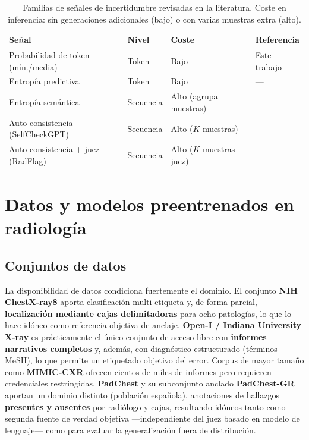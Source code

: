 \begin{table}[t]\centering
\caption{Familias de señales de incertidumbre revisadas en la literatura. Coste en inferencia: sin
generaciones adicionales (bajo) o con varias muestras extra (alto).}
\label{tab:senales_lit}
\begin{tabular}{p{4.3cm}lp{2.9cm}p{3.3cm}}
\toprule
Señal & Nivel & Coste & Referencia \\ \midrule
Probabilidad de token (mín./media) & Token & Bajo & Este trabajo \\
Entropía predictiva & Token & Bajo & --- \\
Entropía semántica & Secuencia & Alto (agrupa muestras) & \parencite{kuhn2023} \\
Auto-consistencia (SelfCheckGPT) & Secuencia & Alto ($K$ muestras) & \parencite{manakul2023} \\
Auto-consistencia + juez (RadFlag) & Secuencia & Alto ($K$ muestras + juez) & \parencite{radflag2024} \\
\bottomrule
\end{tabular}
\end{table}

\section{Datos y modelos preentrenados en radiología}

\subsection{Conjuntos de datos}
La disponibilidad de datos condiciona fuertemente el dominio. El conjunto \textbf{NIH ChestX-ray8}
\parencite{wang2017} aporta clasificación multi-etiqueta y, de forma parcial, \textbf{localización
mediante cajas delimitadoras} para ocho patologías, lo que lo hace idóneo como referencia objetiva de
anclaje. \textbf{Open-I / Indiana University X-ray} \parencite{demnerfushman2016} es prácticamente el
único conjunto de acceso libre con \textbf{informes narrativos completos} y, además, con diagnóstico
estructurado (términos MeSH), lo que permite un etiquetado objetivo del error. Corpus de mayor tamaño
como \textbf{MIMIC-CXR} ofrecen cientos de miles de informes pero requieren credenciales
restringidas. \textbf{PadChest} y su subconjunto anclado \textbf{PadChest-GR} \parencite{padchestgr2024}
aportan un dominio distinto (población española), anotaciones de hallazgos \textbf{presentes y
ausentes} por radiólogo y cajas, resultando idóneos tanto como segunda fuente de verdad objetiva
—independiente del juez basado en modelo de lenguaje— como para evaluar la generalización fuera de
distribución.

